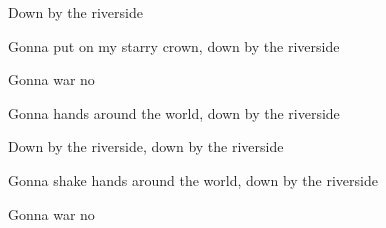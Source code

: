 \begin{SBSong}{Down by the riverside}
\begin{SBVerse}
    Gonna put on my starry crown, down by the riverside

    Gonna  war no  
  \end{SBVerse}
  \CBPageBrk
  \begin{SBVerse}
    Gonna  hands around the world, down by the riverside

    Down by the riverside, down by the riverside
    
    Gonna shake hands around the world, down by the riverside

    Gonna  war no  
  \end{SBVerse}
\end{SBSong}
